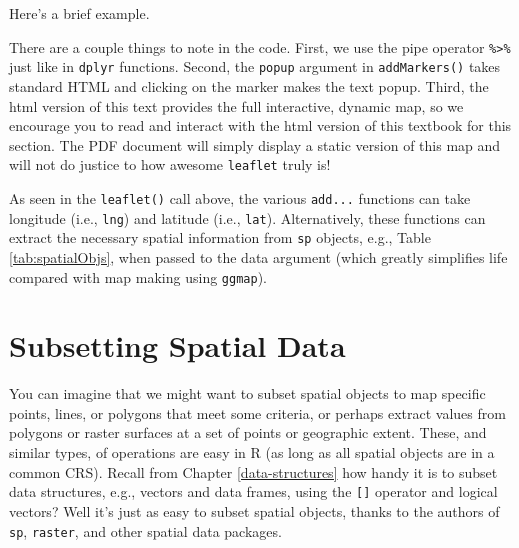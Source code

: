 \documentclass[]{krantz}
\makeatletter
\newenvironment{Shaded}{\begin{snugshade}}{\end{snugshade}}
\newcommand{\CommentTok}[1]{\textcolor[rgb]{0.37,0.37,0.37}{\textit{#1}}}
\newcommand{\DataTypeTok}[1]{\textcolor[rgb]{0.27,0.27,0.27}{#1}}
\newcommand{\ErrorTok}[1]{\textcolor[rgb]{0.14,0.14,0.14}{\textbf{#1}}}
\newcommand{\FloatTok}[1]{\textcolor[rgb]{0.06,0.06,0.06}{#1}}
\newcommand{\KeywordTok}[1]{\textcolor[rgb]{0.27,0.27,0.27}{\textbf{#1}}}
\newcommand{\NormalTok}[1]{#1}
\newcommand{\OperatorTok}[1]{\textcolor[rgb]{0.43,0.43,0.43}{\textbf{#1}}}
\newcommand{\StringTok}[1]{\textcolor[rgb]{0.5,0.5,0.5}{#1}}
\newenvironment{kframe}{%
\medskip{}
\setlength{\fboxsep}{.8em}
 \def\at@end@of@kframe{}%
 \ifinner\ifhmode%
  \def\at@end@of@kframe{\end{minipage}}%
  \begin{minipage}{\columnwidth}%
 \fi\fi%
 \def\FrameCommand##1{\hskip\@totalleftmargin \hskip-\fboxsep
 \colorbox{shadecolor}{##1}\hskip-\fboxsep
     \hskip-\linewidth \hskip-\@totalleftmargin \hskip\columnwidth}%
 \MakeFramed {\advance\hsize-\width
   \@totalleftmargin\z@ \linewidth\hsize
   \@setminipage}}%
 {\par\unskip\endMakeFramed%
 \at@end@of@kframe}
\renewenvironment{Shaded}{\begin{kframe}}{\end{kframe}}
\makeatother
\begin{document}
Here's a brief example.

\begin{Shaded}
\end{Shaded}

\hypertarget{htmlwidget-4b2ba1852a569edfcbe7}{}

There are a couple things to note in the code. First, we use the pipe operator \texttt{\%\textgreater{}\%} just like in \texttt{dplyr} functions. Second, the \texttt{popup} argument in \texttt{addMarkers()} takes standard HTML and clicking on the marker makes the text popup. Third, the html version of this text provides the full interactive, dynamic map, so we encourage you to read and interact with the html version of this textbook for this section. The PDF document will simply display a static version of this map and will not do justice to how awesome \texttt{leaflet} truly is!

As seen in the \texttt{leaflet()} call above, the various \texttt{add...} functions can take longitude (i.e., \texttt{lng}) and latitude (i.e., \texttt{lat}). Alternatively, these functions can extract the necessary spatial information from \texttt{sp} objects, e.g., Table \ref{tab:spatialObjs}, when passed to the data argument (which greatly simplifies life compared with map making using \texttt{ggmap}).

\hypertarget{subsetting-spatial-data}{%
\section{Subsetting Spatial Data}\label{subsetting-spatial-data}}

You can imagine that we might want to subset spatial objects to map specific points, lines, or polygons that meet some criteria, or perhaps extract values from polygons or raster surfaces at a set of points or geographic extent. These, and similar types, of operations are easy in R (as long as all spatial objects are in a common CRS). Recall from Chapter \ref{data-structures} how handy it is to subset data structures, e.g., vectors and data frames, using the \texttt{{[}{]}} operator and logical vectors? Well it's just as easy to subset spatial objects, thanks to the authors of \texttt{sp}, \texttt{raster}, and other spatial data packages.
\end{document}
